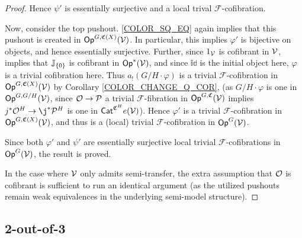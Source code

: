 \documentclass[a4paper,10pt
,draft
]{article}%
\renewcommand{\phi}{\varphi}
\renewcommand{\F}{\mathcal F}
\newcommand{\J}{\mathbb J}
\renewcommand{\1}{\ensuremath{\mathbb{id}}}
\begin{document}
\begin{proof}
      Hence $\psi'$ is essentially surjective and a local trival $\F$-cofibration.

      Now, consider the top pushout. \eqref{COLOR_SQ_EQ} again implies that this pushout is created in $\mathsf{Op}^{G, \mathfrak C(X)}(\mathcal V)$.
      In particular, this implies $\phi'$ is bijective on objects, and hence essentially surjective.
      Further, since $1_{\mathcal V}$ is cofibrant in $\mathcal V$, \cite[Thm. 1.15]{BM13} implies that $\J_{\set 0}$ is cofibrant in $\Op^{\**}(\V)$,
      and since $\1$ is the initial object here, $\phi$ is a trivial cofibration here.
      Thus $a_! (G/H \cdot \phi)$ is a trivial $\F$-cofibration in $\mathsf{Op}^{G, \mathfrak C(X)}(\mathcal V)$ by Corollary \ref{COLOR_CHANGE_Q_COR},
      {(as $G/H \cdot \phi$ is one in $\mathsf{Op}^{G, G/H}(\mathcal V)$,
        since $\mathcal{O} \to \mathcal{P}$ a trivial $\F$-fibration in $\mathsf{Op}^{G, \mathfrak C}(\mathcal V)$
        implies $j^{\**}\O^H \to \j^{\**}\P^H$ is one in $\mathsf{Cat}^{\mathfrak C^H}e(\mathcal V)$)}.
      Hence $\phi'$ is a trivial $\F$-cofibration in $\mathsf{Op}^{G,\mathfrak C(X)}(\mathcal V)$,
      and thus is a (local) trivial $\F$-cofibration in $\mathsf{Op}^G(\mathcal V)$.

      Since both $\phi'$ and $\psi'$ are essentially surjective local trivial $\F$-cofibrations in $\mathsf{Op}^G(\mathcal V)$, the result is proved.

      In the case where $\mathcal V$ only admits semi-transfer, the extra assumption that $\mathcal{O}$ is cofibrant is sufficient to run an identical argument
      (as the utilized pushouts remain weak equivalences in the underlying semi-model structure).
\end{proof}


\subsection{2-out-of-3}
\end{document}
